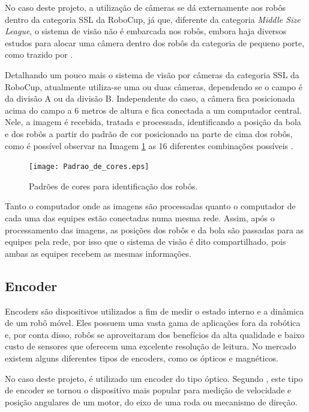 \documentclass[acronym, symbols, table]{fei}
\begin{document}
				No caso deste projeto, a utilização de câmeras se dá externamente aos robôs dentro da categoria SSL da RoboCup, já que, diferente da categoria \textit{Middle Size League}, o sistema de visão não é embarcada nos robôs, embora haja diversos estudos para alocar uma câmera dentro dos robôs da categoria de pequeno porte, como trazido por \textcite{melo2022embedded}.
				
				Detalhando um pouco mais o sistema de visão por câmeras da categoria SSL da RoboCup, atualmente utiliza-se uma ou duas câmeras, dependendo se o campo é da divisão A ou da divisão B. Independente do caso, a câmera fica posicionada acima do campo a 6 metros de altura e fica conectada a um computador central. Nele, a imagem é recebida, tratada e processada, identificando a posição da bola e dos robôs a partir do padrão de cor posicionado na parte de cima dos robôs, como é possível observar na Imagem \ref{fig:color_patterns} as 16 diferentes combinações possíveis \cite{10.1007/978-3-642-11876-0_37}.
				
				\begin{figure}[!htb]
					\centering
					\caption{Padrões de cores para identificação dos robôs.} 
					\texttt{[image: Padrao\_de\_cores.eps]}
					\label{fig:color_patterns}
				\end{figure}
			
				Tanto o computador onde as imagens são processadas quanto o computador de cada uma das equipes estão conectadas numa mesma rede. Assim, após o processamento das imagens, as posições dos robôs e da bola são passadas para as equipes pela rede, por isso que o sistema de visão é dito compartilhado, pois ambas as equipes recebem as mesmas informações.
			
			\subsection{Encoder}\label{sec:sensores_encoders}
				
				Encoders são dispositivos utilizados a fim de medir o estado interno e a dinâmica de um robô móvel. Eles possuem uma vasta gama de aplicações fora da robótica e, por conta disso, robôs se aproveitaram dos benefícios da alta qualidade e baixo custo de sensores que oferecem uma excelente resolução de leitura. No mercado existem alguns diferentes tipos de encoders, como os ópticos e magnéticos. 
				
				No caso deste projeto, é utilizado um encoder do tipo óptico. Segundo \textcite{siegwart2011introduction}, este tipo de encoder se tornou o dispositivo mais popular para medição de velocidade e posição angulares de um motor, do eixo de uma roda ou mecanismo de direção.
				
\end{document}
